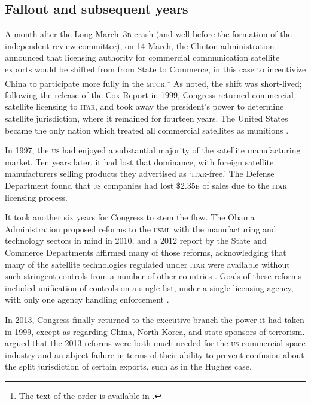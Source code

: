 \documentclass[12pt]{olfmemo}
\begin{document}
\subsection{Fallout and subsequent years}
A month after the Long March~\textsc{3b} crash (and well before the formation of the independent review committee), on 14 March, the Clinton administration announced that licensing authority for commercial communication satellite exports would be shifted from from State to Commerce, in this case to incentivize China to participate more fully in the \textsc{mtcr}.\footnote{The text of the order is available in \citet{State61FR56894_1996}.} As \citet{Zinger2015} noted, the shift was short-lived; following the release of the Cox Report in 1999, Congress returned commercial satellite licensing to \textsc{itar}, and took away the president's power to determine satellite jurisdiction, where it remained for fourteen years. The United States became the only nation which treated all commercial satellites as munitions \citep{Section1248}.

In 1997, the \textsc{us} had enjoyed a substantial majority of the satellite manufacturing market. Ten years later, it had lost that dominance, with foreign satellite manufacturers selling products they advertised as `\textsc{itar}-free.' The Defense Department found that \textsc{us} companies had lost \$2.35\textsc{b} of sales due to the \textsc{itar} licensing process. \citep{AFRL2007}

It took another six years for Congress to stem the flow. The Obama Administration proposed reforms to the \textsc{usml} with the manufacturing and technology sectors in mind in 2010, and a 2012 report by the State and Commerce Departments affirmed many of those reforms, acknowledging that many of the satellite technologies regulated under \textsc{itar} were available without such stringent controls from a number of other countries \citep{Section1248}. Goals of these reforms included unification of controls on a single list, under a single licensing agency, with only one agency handling enforcement \citep{Fergusson2020}.

In 2013, Congress finally returned to the executive branch the power it had taken in 1999, except as regarding China, North Korea, and state sponsors of terrorism. \citet{Zinger2015} argued that the 2013 reforms were both much-needed for the \textsc{us} commercial space industry and an abject failure in terms of their ability to prevent confusion about the split jurisdiction of certain exports, such as in the Hughes case.
\end{document}
